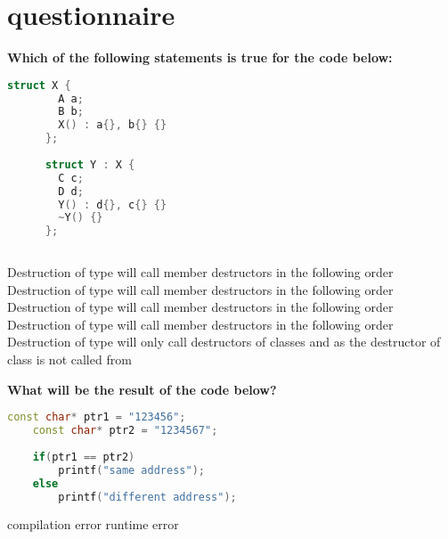 \chapter{\CC questionnaire}


    
\begin{questions}[start=1] %

\question \textbf{Which of the following statements is true for the code below:} 
\begin{lstlisting}[language=c++,numbers=none, caption={}]
    struct X {
        A a;
        B b;
        X() : a{}, b{} {}
      };
      
      struct Y : X {
        C c;
        D d;
        Y() : d{}, c{} {}
        ~Y() {}
      };
      

    \end{lstlisting} 
\begin{choices}
 \choice Destruction of type  will call member destructors in the following order \mbox{}
 \choice Destruction of type  will call member destructors in the following order \mbox{}
 \choice Destruction of type  will call member destructors in the following order \mbox{}
 \choice Destruction of type  will call member destructors in the following order \mbox{}
 \choice Destruction of type  will only call destructors of classes  and  as the destructor of class  is not called from 
\end{choices}

\hrulefill

\question \textbf{What will be the result of the code below?} 
\begin{lstlisting}[language=c++,numbers=none, caption={}]
    const char* ptr1 = "123456";
    const char* ptr2 = "1234567";
    
    if(ptr1 == ptr2)
        printf("same address");
    else
        printf("different address");
    \end{lstlisting} 
\begin{choices}
 \choice {}
 \choice {}
 \choice compilation error
 \choice runtime error
\end{choices}

\hrulefill


\end{questions}